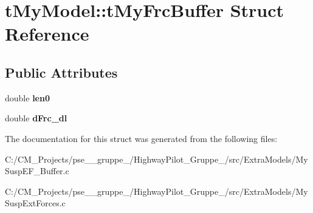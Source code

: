 \hypertarget{structt_my_model_1_1t_my_frc_buffer}{}\section{t\+My\+Model\+::t\+My\+Frc\+Buffer Struct Reference}
\label{structt_my_model_1_1t_my_frc_buffer}
\subsection*{Public Attributes}
\begin{DoxyCompactItemize}
\item 
\mbox{\label{structt_my_model_1_1t_my_frc_buffer_a19635ba6ffa137cf13109fb1bc78064e}} 
double {\bfseries len0}
\item 
\mbox{\label{structt_my_model_1_1t_my_frc_buffer_a2f7f97c98c43306cbcefec737b1645ad}} 
double {\bfseries d\+Frc\+\_\+dl}
\end{DoxyCompactItemize}


The documentation for this struct was generated from the following files\+:\begin{DoxyCompactItemize}
\item 
C\+:/\+C\+M\+\_\+\+Projects/pse\+\_\+\_\+gruppe\+\_/\+Highway\+Pilot\+\_\+\+Gruppe\+\_/src/\+Extra\+Models/My\+Susp\+E\+F\+\_\+\+Buffer.\+c\item 
C\+:/\+C\+M\+\_\+\+Projects/pse\+\_\+\_\+gruppe\+\_/\+Highway\+Pilot\+\_\+\+Gruppe\+\_/src/\+Extra\+Models/My\+Susp\+Ext\+Forces.\+c\end{DoxyCompactItemize}
